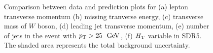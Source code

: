 \begin{figure}[htb]
\begin{center}
	\caption{Comparison between data and prediction plots for (a) lepton transverse momentum 
        (b) missing tranverse energy, (c) transverse mass of $W$ boson, (d)
        leading jet transverse momentum, (e) number of jets in the event with $\pt>25~\gev$,
        (f) $\HT$ variable in SDR5.
        The shaded area represents the total background uncertainty.\label{fig:sdr5}}
\end{center}\end{figure}
